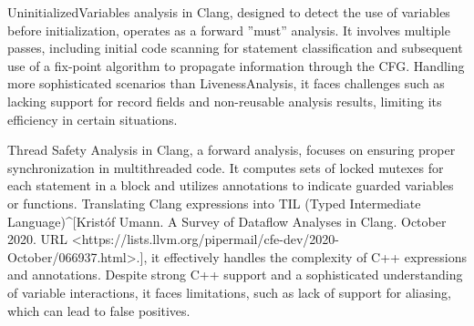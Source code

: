UninitializedVariables analysis in Clang, designed to detect the use of variables before initialization, operates as a forward ”must” analysis. It involves multiple passes, including initial code scanning for statement classification and subsequent use of a fix-point algorithm to propagate information through the CFG. Handling more sophisticated scenarios than LivenessAnalysis, it faces challenges such as lacking support for record fields and non-reusable analysis results, limiting its efficiency in certain situations.

\begin{markdown}
Thread Safety Analysis in Clang, a forward analysis, focuses on ensuring proper synchronization in multithreaded code. It computes sets of locked mutexes for each statement in a block and utilizes annotations to indicate guarded variables or functions. Translating Clang expressions into TIL (Typed Intermediate Language)^[Kristóf Umann. A Survey of Dataflow Analyses in Clang. October 2020. URL <https://lists.llvm.org/pipermail/cfe-dev/2020-October/066937.html>.], it effectively handles the complexity of C++ expressions and annotations. Despite strong C++ support and a sophisticated understanding of variable interactions, it faces limitations, such as lack of support for aliasing, which can lead to false positives.
\end{markdown}









